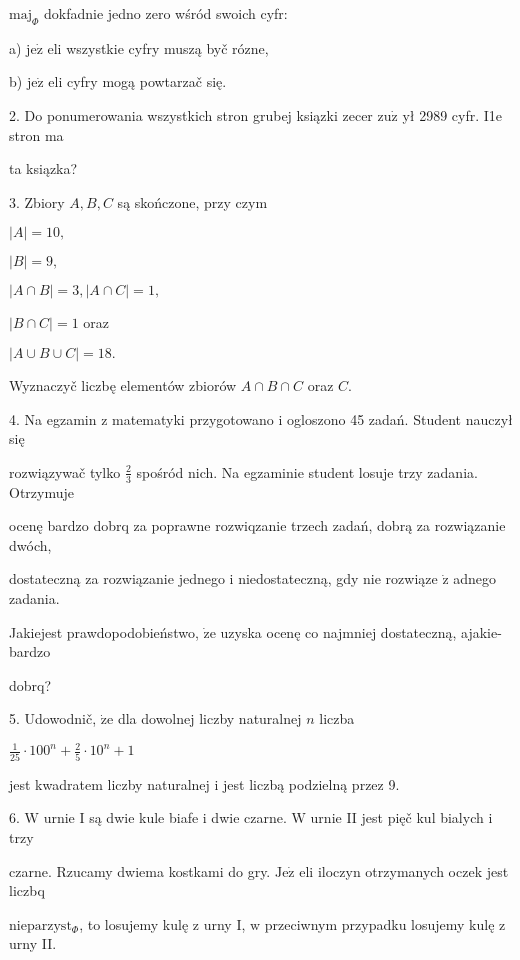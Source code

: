 \documentclass[a4paper,12pt]{article}
\begin{document}
$\mathrm{m}\mathrm{a}\mathrm{j}_{\Phi}$ dokfadnie jedno zero wśród swoich cyfr:

a) $\mathrm{j}\mathrm{e}\dot{\mathrm{z}}$ eli wszystkie cyfry muszą byč rózne,

b) $\mathrm{j}\mathrm{e}\dot{\mathrm{z}}$ eli cyfry mogą powtarzač się.

2. Do ponumerowania wszystkich stron grubej ksiązki zecer $\mathrm{z}\mathrm{u}\dot{\mathrm{z}}$ ył 2989 cyfr. I1e stron ma

ta ksiązka?

3. Zbiory $A, B, C$ są skończone, przy czym

$|A|=10,$

$|B|=9,$

$|A\cap B|=3, |A\cap C|=1,$

$|B\cap C|=1$ oraz

$|A\cup B\cup C|=18.$

Wyznaczyč liczbę elementów zbiorów $A\cap B\cap C$ oraz $C.$

4. Na egzamin $\mathrm{z}$ matematyki przygotowano $\mathrm{i}$ ogloszono 45 zadań. Student nauczył się

rozwiązywač tylko $\displaystyle \frac{2}{3}$ spośród nich. Na egzaminie student losuje trzy zadania. Otrzymuje

ocenę bardzo dobrq za poprawne rozwiqzanie trzech zadań, dobrą za rozwiązanie dwóch,

dostateczną za rozwiązanie jednego $\mathrm{i}$ niedostateczną, gdy nie rozwiąze $\dot{\mathrm{z}}$ adnego zadania.

Jakiejest prawdopodobieństwo, $\dot{\mathrm{z}}\mathrm{e}$ uzyska ocenę co najmniej dostateczną, ajakie- bardzo

dobrq?

5. Udowodnič, $\dot{\mathrm{z}}\mathrm{e}$ dla dowolnej liczby naturalnej $n$ liczba

$\displaystyle \frac{1}{25}\cdot 100^{n}+\frac{2}{5}\cdot 10^{n}+1$

jest kwadratem liczby naturalnej $\mathrm{i}$ jest liczbą podzielną przez 9.

6. $\mathrm{W}$ urnie I są dwie kule biafe $\mathrm{i}$ dwie czarne. $\mathrm{W}$ urnie II jest pięč kul bialych $\mathrm{i}$ trzy

czarne. Rzucamy dwiema kostkami do gry. $\mathrm{J}\mathrm{e}\dot{\mathrm{z}}$ eli iloczyn otrzymanych oczek jest liczbq

$\mathrm{n}\mathrm{i}\mathrm{e}\mathrm{p}\mathrm{a}\mathrm{r}\mathrm{z}\mathrm{y}\mathrm{s}\mathrm{t}_{\Phi}$, to losujemy kulę $\mathrm{z}$ urny I, $\mathrm{w}$ przeciwnym przypadku losujemy kulę $\mathrm{z}$ urny II.
\end{document}

